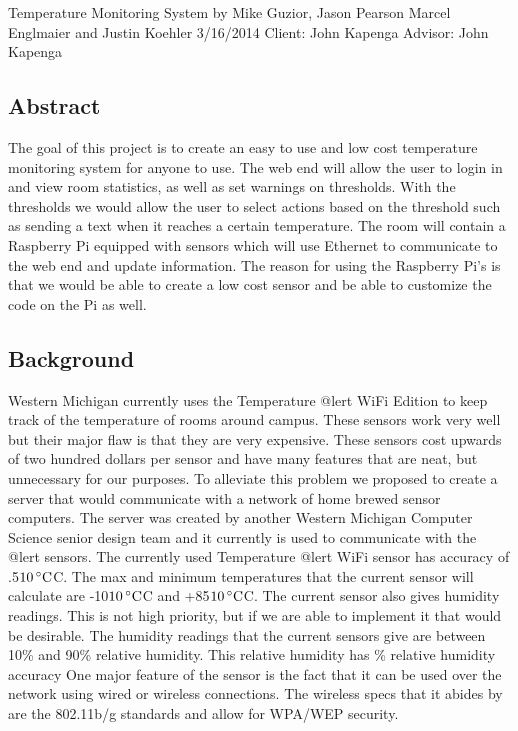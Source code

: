 \documentclass{report}
\begin{document}
\begin{titlepage}

\vspace*{\fill}
\begin{center}
Temperature Monitoring System
by Mike Guzior, Jason Pearson
Marcel Englmaier and Justin Koehler
3/16/2014
Client: John Kapenga
Advisor: John Kapenga
\end{center}
\vspace*{\fill}
\end{titlepage}
\newpage
\tableofcontents
\newpage

\subsection*{Abstract}
The goal of this project is to create an easy to use and low cost temperature monitoring system for anyone to use. The web end will allow the user to login in and view room statistics, as well as set warnings on thresholds. With the thresholds we would allow the user to select actions based on the threshold such as sending a text when it reaches a certain temperature.  The room will contain a Raspberry Pi equipped with sensors which will use Ethernet to communicate to the web end and update information. The reason for using the Raspberry Pi’s is that we would be able to create a low cost sensor and be able to customize the code on the Pi as well. 
\newpage
\subsection*{Background}
	Western Michigan currently uses the Temperature @lert WiFi Edition to keep track of the temperature of rooms around campus. These sensors work very well but their major flaw is that they are very expensive. These sensors cost upwards of two hundred dollars per sensor and have many features that are neat, but unnecessary for our purposes. To alleviate this problem we proposed to create a server that would communicate with a network of home brewed sensor computers. The server was created by another Western Michigan Computer Science senior design team and it currently is used to communicate with the @lert sensors.  
	\newline
	\indent
	The currently used Temperature @lert WiFi sensor has accuracy of \pm.5$10\,^{\circ}{\rm C}$C. The max and minimum temperatures that the current sensor will calculate are -10$10\,^{\circ}{\rm C}$C and +85$10\,^{\circ}{\rm C}$C. The current sensor also gives humidity readings. This is not high priority, but if we are able to implement it that would be desirable. The humidity readings that the current sensors give are between 10\% and 90\% relative humidity. This relative humidity has \% relative humidity accuracy One major feature of the sensor is the fact that it can be used over the network using wired or wireless connections. The wireless specs that it abides by are the 802.11b/g standards and allow for WPA/WEP security. 
\end{document}

